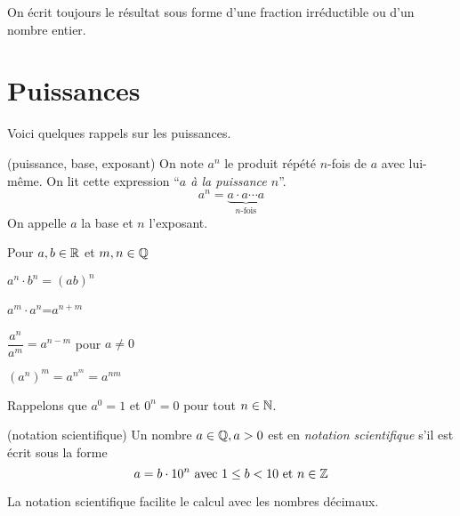 \documentclass[a4paper,12pt]{report}
\begin{document}
\begin{rem}
	On écrit toujours le résultat sous forme d'une fraction irréductible ou d'un nombre entier.
\end{rem}

\section{Puissances}
Voici quelques rappels sur les puissances. 

\begin{defi}(puissance, base, exposant)
	On note $a^n$ le produit répété $n$-fois de $a$ avec lui-même.
	On lit cette expression \enquote{\emph{$a$ à la puissance $n$}}. 
	\[a^n=\underbrace{a\cdot a\cdots a}_{n\text{-fois}}\]
	On appelle $a$ la base et $n$ l'exposant. 
\end{defi}

\begin{proprietes}
	Pour $a,b\in \mathbb R$ et $m,n\in \mathbb Q$
	\begin{center}

	\begin{inlineumerate}[label={\arabic*)}]
		\item $a^n\cdot b^n=(ab)^n$
		\item $a^m\cdot a^n$=$a^{n+m}$
		\item $\dfrac{a^n}{a^m}=a^{n-m}$ pour $a\neq 0$
		\item $(a^n)^m=a^{n^m}=a^{nm}$
	\end{inlineumerate}
	\end{center}
\end{proprietes}
Rappelons que $a^0=1$ et $0^n=0$ pour tout $n\in \mathbb N$. 

\begin{defi}(notation scientifique)
	Un nombre $a\in \mathbb Q, a>0$ est en \emph{notation scientifique} s'il est écrit sous la forme 
	\[a=b\cdot 10^n \text{ avec } 1\leq b<10 \text{ et } n\in \mathbb Z\]
\end{defi}
\begin{technique}
	La notation scientifique facilite le calcul avec les nombres décimaux.
\end{technique}
\end{document}
